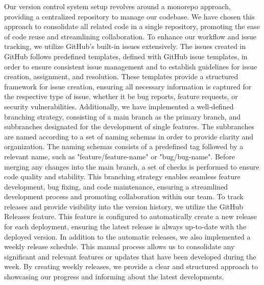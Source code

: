 Our version control system setup revolves around a monorepo approach, providing a centralized repository to manage our codebase. We have chosen this approach to consolidate all related code in a single repository, promoting the ease of code reuse and streamlining collaboration.
To enhance our workflow and issue tracking, we utilize GitHub's built-in issues extensively. The issues created in GitHub follows predefined templates, defined with GitHub issue templates, in order to ensure consistent issue management and to establish guidelines for issue creation, assignment, and resolution. These templates provide a structured framework for issue creation, ensuring all necessary information is captured for the respective type of issue, whether it be bug reports, feature requests, or security vulnerabilities. Additionally, we have implemented a well-defined branching strategy, consisting of a main branch as the primary branch, and subbranches designated for the development of single features. The subbranches are named according to a set of naming schemas in order to provide clarity and organization. The naming schemas consists of a predefined tag followed by a relevant name, such as "feature/{feature-name}" or "bug/{bug-name}". Before merging any changes into the main branch, a set of checks is performed to ensure code quality and stability. %
This branching strategy enables seamless feature development, bug fixing, and code maintenance, ensuring a streamlined development process and promoting collaboration within our team. %
To track releases and provide visibility into the version history, we utilize the GitHub Releases feature. This feature is configured to automatically create a new release for each deployment, ensuring the latest release is always up-to-date with the deployed version. In addition to the automatic releases, we also implemented a weekly release schedule. This manual process allows us to consolidate any significant and relevant features or updates that have been developed during the week. By creating weekly releases, we provide a clear and structured approach to showcasing our progress and informing about the latest developments.


